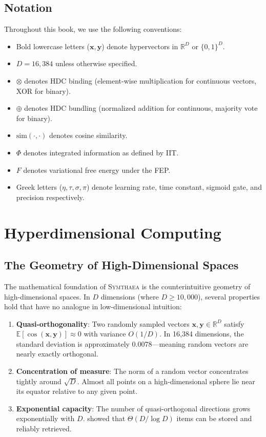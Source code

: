 \documentclass[12pt]{book}
\newcommand{\bind}{\otimes}
\newcommand{\bundle}{\oplus}
\newcommand{\symthaea}{\textsc{Symthaea}}
\newcommand{\R}{\mathbb{R}}
\newcommand{\E}{\mathbb{E}}
\begin{document}
\section{Notation}

Throughout this book, we use the following conventions:
\begin{itemize}
  \item Bold lowercase letters ($\mathbf{x}, \mathbf{y}$) denote hypervectors in $\R^D$ or $\{0,1\}^D$.
  \item $D = 16{,}384$ unless otherwise specified.
  \item $\bind$ denotes HDC binding (element-wise multiplication for continuous vectors, XOR for binary).
  \item $\bundle$ denotes HDC bundling (normalized addition for continuous, majority vote for binary).
  \item $\text{sim}(\cdot, \cdot)$ denotes cosine similarity.
  \item $\Phi$ denotes integrated information as defined by IIT.
  \item $F$ denotes variational free energy under the FEP.
  \item Greek letters ($\eta, \tau, \sigma, \pi$) denote learning rate, time constant, sigmoid gate, and precision respectively.
\end{itemize}


\chapter{Hyperdimensional Computing}
\label{ch:hdc}

\section{The Geometry of High-Dimensional Spaces}

The mathematical foundation of \symthaea{} is the counterintuitive geometry of high-dimensional spaces. In $D$ dimensions (where $D \geq 10{,}000$), several properties hold that have no analogue in low-dimensional intuition:

\begin{enumerate}
  \item \textbf{Quasi-orthogonality}: Two randomly sampled vectors $\mathbf{x}, \mathbf{y} \in \R^D$ satisfy $\E[\cos(\mathbf{x}, \mathbf{y})] \approx 0$ with variance $O(1/D)$. In 16,384 dimensions, the standard deviation is approximately 0.0078---meaning random vectors are nearly exactly orthogonal.
  \item \textbf{Concentration of measure}: The norm of a random vector concentrates tightly around $\sqrt{D}$. Almost all points on a high-dimensional sphere lie near its equator relative to any given point.
  \item \textbf{Exponential capacity}: The number of quasi-orthogonal directions grows exponentially with $D$. \citet{thomas2021theoretical} showed that $\Theta(D / \log D)$ items can be stored and reliably retrieved.
\end{enumerate}
\end{document}
